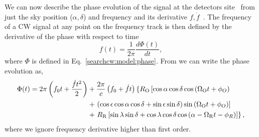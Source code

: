 We can now describe the phase evolution of the signal at the detectors
site~ from just the sky
position ($\alpha, \delta$) and frequency and its derivative
$f,\dot{f}$~. The frequency of a \gls{CW}
signal at any point on the frequency track is then defined by the derivative of
the phase with respect to time~
%
\begin{equation}
    f(t) = \frac{1}{2\pi}\frac{d\Phi(t)}{dt}, 
\end{equation}
%
where $\Phi$ is defined in Eq.~\ref{searchcw:model:phase}.  From
\citep{schutz1998DataAnalysis} we can write the phase evolution as,
%
\begin{equation}
    \label{par_est:freq:ph_evolution}
    \begin{split}
        \Phi(t) = 2\pi \left(  f_0 t + \frac{\dot{f} t^2}{2} \right) &+ \frac{2\pi}{c} \left(  f_0 + \dot{f}t  \right) \left\{ R_{\rm{O}} \left[ \cos \alpha \cos \delta \cos \left( \Omega_{\mathrm{O}} t + \phi_{O}  \right) \right. \right. \\ 
        &+ \left. \left( \cos \epsilon \cos \alpha \cos \delta +  \sin \epsilon \sin \delta \right) \sin \left( \Omega_{\mathrm{O}} t + \phi_{O}  \right) \right] \\
        &+ \left. R_{\rm{R}} \left[ \sin \lambda \sin \delta + \cos \lambda \cos \delta \cos \left( \alpha - \Omega_{\mathrm{R}} t - \phi_{R}  \right)     \right] \right\},
    \end{split}
\end{equation}
%
where we ignore frequency derivative higher than first order.~

